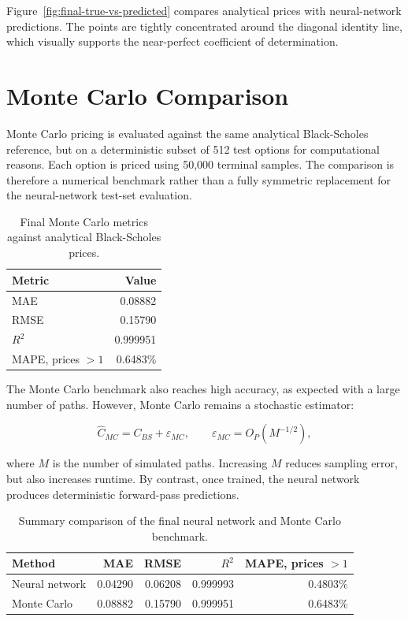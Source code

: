Figure~\ref{fig:final-true-vs-predicted} compares analytical prices with neural-network predictions.
The points are tightly concentrated around the diagonal identity line, which visually supports the near-perfect coefficient of determination.

\section{Monte Carlo Comparison}

Monte Carlo pricing is evaluated against the same analytical Black-Scholes reference, but on a deterministic subset of 512 test options for computational reasons.
Each option is priced using 50,000 terminal samples.
The comparison is therefore a numerical benchmark rather than a fully symmetric replacement for the neural-network test-set evaluation.

\begin{table}[H]
    \centering
    \begin{tabular}{lr}
        \toprule
        Metric             & Value    \\
        \midrule
        MAE                & 0.08882  \\
        RMSE               & 0.15790  \\
        $R^2$              & 0.999951 \\
        MAPE, prices $> 1$ & 0.6483\% \\
        \bottomrule
    \end{tabular}
    \caption{Final Monte Carlo metrics against analytical Black-Scholes prices.}
    \label{tab:mc-final-metrics}
\end{table}

The Monte Carlo benchmark also reaches high accuracy, as expected with a large number of paths.
However, Monte Carlo remains a stochastic estimator:

\begin{equation}
    \hat{C}_{MC}
    =
    C_{BS}
    +
    \varepsilon_{MC},
    \qquad
    \varepsilon_{MC} = O_P(M^{-1/2}),
\end{equation}

where $M$ is the number of simulated paths.
Increasing $M$ reduces sampling error, but also increases runtime.
By contrast, once trained, the neural network produces deterministic forward-pass predictions.

\begin{table}[H]
    \centering
    \begin{tabular}{lrrrr}
        \toprule
        Method & MAE & RMSE & $R^2$ & MAPE, prices $> 1$ \\
        \midrule
        Neural network & 0.04290 & 0.06208 & 0.999993 & 0.4803\% \\
        Monte Carlo    & 0.08882 & 0.15790 & 0.999951 & 0.6483\% \\
        \bottomrule
    \end{tabular}
    \caption{Summary comparison of the final neural network and Monte Carlo benchmark.}
    \label{tab:nn-mc-summary}
\end{table}

